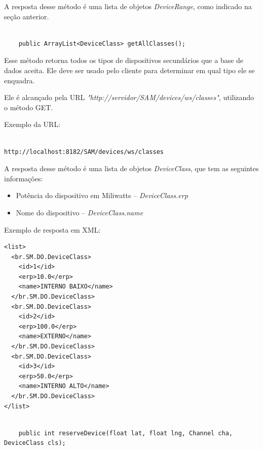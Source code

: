 A resposta desse método é uma lista de objetos \textit{DeviceRange}, como indicado na seção anterior.


\begin{lstlisting}

	public ArrayList<DeviceClass> getAllClasses();

\end{lstlisting}

Esse método retorna todos os tipos de dispositivos secundários que a base de dados aceita. Ele deve ser usado pelo cliente para determinar em qual tipo ele se enquadra.

Ele é alcançado pela URL \textit{"http://servidor/SAM/devices/ws/classes"}, utilizando o método GET.

Exemplo da URL:

\begin{lstlisting}	

http://localhost:8182/SAM/devices/ws/classes

\end{lstlisting}

\FloatBarrier

A resposta desse método é uma lista de objetos \textit{DeviceClass}, que tem as seguintes informações:

\begin{itemize}
\item Potência do dispositivo em Miliwatts -- \textit{DeviceClass.erp}
\item Nome do dispositivo -- \textit{DeviceClass.name}
\end{itemize}

Exemplo de resposta em XML:

\begin{lstlisting}	
<list>
  <br.SM.DO.DeviceClass>
    <id>1</id>
    <erp>10.0</erp>
    <name>INTERNO BAIXO</name>
  </br.SM.DO.DeviceClass>
  <br.SM.DO.DeviceClass>
    <id>2</id>
    <erp>100.0</erp>
    <name>EXTERNO</name>
  </br.SM.DO.DeviceClass>
  <br.SM.DO.DeviceClass>
    <id>3</id>
    <erp>50.0</erp>
    <name>INTERNO ALTO</name>
  </br.SM.DO.DeviceClass>
</list>
\end{lstlisting}



\begin{lstlisting}

	public int reserveDevice(float lat, float lng, Channel cha, DeviceClass cls);

\end{lstlisting}

